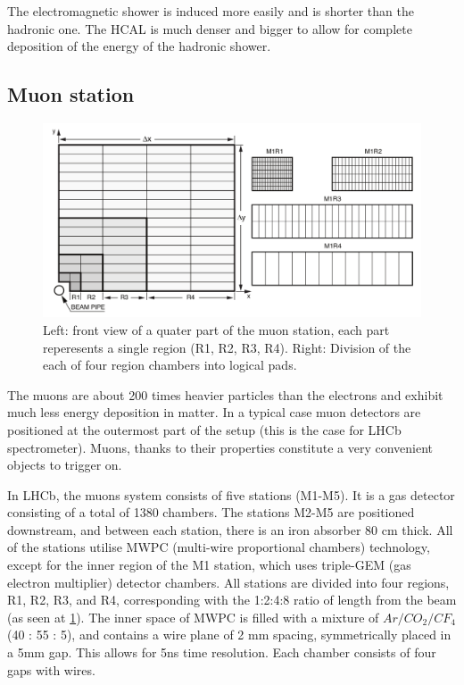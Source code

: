 The electromagnetic shower is induced more easily and is shorter than the hadronic one.
The HCAL is much denser and bigger to allow for complete deposition of the energy of the hadronic shower.

\subsection{Muon station}

\begin{figure}
  \centering
  \includegraphics[width=0.9\linewidth]{figures/chapter2/muon_system_partition.png}
  \caption[somethingelse]{Left: front view of a quater part of the muon station, each part reperesents a single region (R1, R2, R3, R4). Right: Division of the each of four region chambers into logical pads.} 

  \label{fig:muon_partition}
\end{figure}

The muons are about 200 times heavier particles than the electrons and exhibit much less energy deposition in matter. In a typical case muon detectors are positioned at the outermost part of the setup (this is the case for LHCb spectrometer). Muons, thanks to their properties constitute a very convenient objects to trigger on. 

In LHCb, the muons system consists of five stations (M1-M5). It is a gas detector consisting of a total of 1380 chambers.
The stations M2-M5 are positioned downstream, and between each station, there is an iron absorber 80 cm thick.
All of the stations utilise MWPC (multi-wire proportional chambers) technology, except for the inner region of the M1 station, which uses triple-GEM (gas electron multiplier) detector chambers.
All stations are divided into four regions, R1, R2, R3, and R4, corresponding with the 1:2:4:8 ratio of length from the beam (as seen at \ref{fig:muon_partition}).
The inner space of MWPC is filled with a mixture of $Ar/CO_{2} /CF_{4}$ (40 : 55 : 5), and contains a wire plane of 2 mm spacing, symmetrically placed in a 5mm gap. This allows for 5ns time resolution.
Each chamber consists of four gaps with wires.


